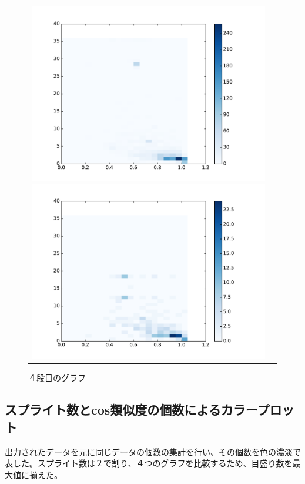 \documentclass[a4paper,10pt,onecolumn,oneside,openany]{jsbook}
\begin{document}
\begin{figure}[h]
\begin{tabular}{cc}
 	\begin{minipage}[t]{0.45\hsize}
	 \centering
	 \includegraphics[keepaspectratio, scale = 0.35]{colormap_block_3.pdf}
	 \caption{３段目のグラフ}
	 \label{third_block_color}
	\end{minipage}
        \begin{minipage}[t]{0.45\hsize}
	 \centering
	 \includegraphics[keepaspectratio, scale = 0.35]{colormap_block_4.pdf}
	 \caption{４段目のグラフ}
	 \label{fourth_block_color}
	\end{minipage}
 \end{tabular}
 \end{figure}
  
\newpage
 \subsection{スプライト数とcos類似度の個数によるカラープロット}
出力されたデータを元に同じデータの個数の集計を行い、その個数を色の濃淡で表した。スプライト数は２で割り、４つのグラフを比較するため、目盛り数を最大値に揃えた。 
 
\end{document}
